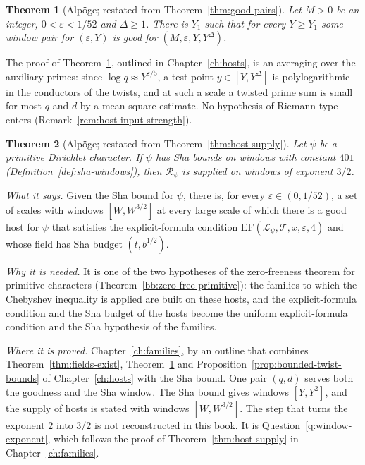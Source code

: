 \documentclass[11pt]{amsbook}
\theoremstyle{plain}
\newtheorem{theorem}{Theorem}[section]
\theoremstyle{definition}
\theoremstyle{remark}
\numberwithin{equation}{section}
\numberwithin{figure}{chapter}
\numberwithin{table}{chapter}
\newcommand{\eps}{\varepsilon}
\newcommand{\lev}{\mathscr{L}}
\newcommand{\Top}{\mathcal{T}}
\begin{document}
\begin{theorem}[Alp\"oge; restated from Theorem~\ref{thm:good-pairs}]
\label{bb:good-pairs}
Let $M>0$ be an integer, $0<\eps<1/52$ and $\Delta\ge1$. There is
$Y_1$ such that for every $Y\ge Y_1$ some window pair for $(\eps,Y)$
is good for $(M,\eps,Y,Y^\Delta)$.
\end{theorem}

\noindent The proof of Theorem~\ref{bb:good-pairs}, outlined in
Chapter~\ref{ch:hosts}, is an averaging over the auxiliary primes:
since $\log q\approx Y^{\eps/5}$, a test point $y\in[Y,Y^\Delta]$ is
polylogarithmic in the conductors of the twists, and at such a scale
a twisted prime sum is small for most $q$ and $d$ by a mean-square
estimate. No hypothesis of Riemann type enters
(Remark~\ref{rem:host-input-strength}).

\begin{theorem}[Alp\"oge; restated from Theorem~\ref{thm:host-supply}]
\label{bb:host-supply}
Let $\psi$ be a primitive Dirichlet character. If $\psi$ has Sha
bounds on windows with constant $401$
(Definition~\ref{def:sha-windows}), then
$\mathscr R_\psi$ is supplied on windows of exponent $3/2$.
\end{theorem}

\noindent\emph{What it says.} Given the Sha bound for $\psi$, there
is, for every $\eps\in(0,1/52)$, a set of scales with windows
$[W,W^{3/2}]$ at every large scale of which there is a good host for
$\psi$ that satisfies the explicit-formula condition
$\mathrm{EF}(\lev_\psi,\Top,x,\eps,4)$ and whose field has Sha budget
$(t,b^{1/2})$.

\noindent\emph{Why it is needed.} It is one of the two hypotheses of
the zero-freeness theorem for primitive characters
(Theorem~\ref{bb:zero-free-primitive}): the families to which the
Chebyshev inequality is applied are built on these hosts, and the
explicit-formula condition and the Sha budget of the hosts become the
uniform explicit-formula condition and the Sha hypothesis of the
families.

\noindent\emph{Where it is proved.} Chapter~\ref{ch:families}, by an
outline that combines Theorem~\ref{thm:fields-exist},
Theorem~\ref{bb:good-pairs} and
Proposition~\ref{prop:bounded-twist-bounds} of
Chapter~\ref{ch:hosts} with the Sha bound. One pair $(q,d)$ serves
both the goodness and the Sha window. The Sha bound gives windows
$[Y,Y^2]$, and the supply of hosts is stated with windows
$[W,W^{3/2}]$. The step that turns the exponent $2$ into $3/2$ is
not reconstructed in this book. It is
Question~\ref{q:window-exponent}, which follows the proof of
Theorem~\ref{thm:host-supply} in Chapter~\ref{ch:families}.
\end{document}
